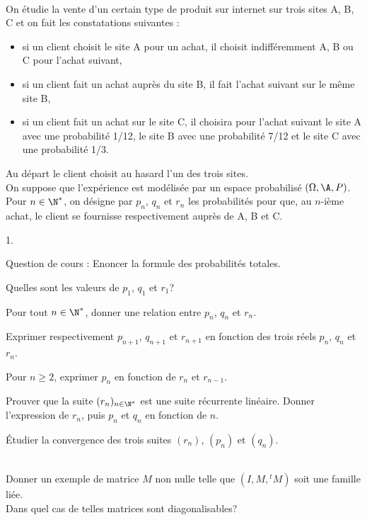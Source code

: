 \documentclass[11pt]{article}%
\begin{document}
\begin{exerciceAP}~\\
  On étudie la vente d'un certain type de produit sur internet sur
  trois sites A, B, C et on fait les constatations suivantes :
  \begin{itemize}
  \item si un client choisit le site A pour un achat, il choisit
    indifféremment A, B ou C pour l'achat suivant,
  \item si un client fait un achat auprès du site B, il fait l'achat
    suivant sur le même site B,
  \item si un client fait un achat sur le site C, il choisira pour
    l'achat suivant le site A avec une probabilité 1/12, le site B
    avec une probabilité 7/12 et le site C avec une probabilité 1/3.
  \end{itemize}
  Au départ le client choisit au hasard l'un des trois sites. \\
  On suppose que l'expérience est modélisée par un espace probabilisé
  $(\Omega , \A , P)$. \\
  Pour $n \in \N^*$, on désigne par $p_n$, $q_n$ et $r_n$ les
  probabilités pour que, au $n$-ième achat, le client se fournisse
  respectivement auprès de A, B et C.
  \begin{noliste}{1.}
    \setlength{\itemsep}{2mm}
  \item Question de cours : Enoncer la formule des probabilités
    totales.
  \item Quelles sont les valeurs de $p_1$, $q_1$ et $r_1$?
  \item Pour tout $n \in \N^*$, donner une relation entre $p_n$, $q_n$ et $r_n$.
  \item Exprimer respectivement $p_{n+1}$, $q_{n+1}$ et $r_{n+1}$ en
    fonction des trois réels $p_n$, $q_n$ et $r_n$.
  \item Pour $n \geq 2$, exprimer $p_n$ en fonction de $r_n$ et
    $r_{n-1}$.
  \item Prouver que la suite $(r_n)_{n \in \N^*}$ est une suite
    récurrente linéaire. Donner l'expression de $r_n$, puis $p_n$ et
    $q_n$ en fonction de $n$.
  \item Étudier la convergence des trois suites $(r_n)$, $(p_n)$ et $(q_n)$. \\
  \end{noliste}
\end{exerciceAP}


\begin{exerciceSP}~\\
  Donner un exemple de matrice $M$ non nulle telle que $(I , M , {}^t
  M)$ soit une famille liée. \\
  Dans quel cas de telles matrices sont diagonalisables?
\end{exerciceSP}
\end{document}
